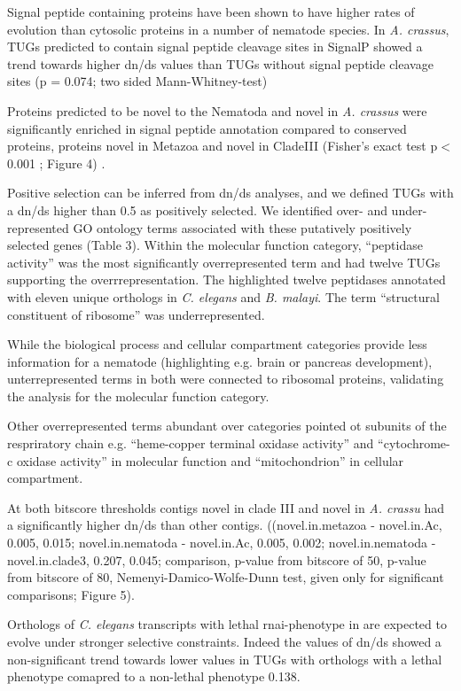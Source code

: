 \documentclass[10pt]{bmc_article}
\newenvironment{bmcformat}{\begin{raggedright}\baselineskip20pt\sloppy\setboolean{publ}{false}}{\end{raggedright}\baselineskip20pt\sloppy}
\begin{document}
\begin{bmcformat}
Signal peptide containing proteins have been shown to have higher
rates of evolution than cytosolic proteins in a number of nematode
species. In \textit{A. crassus}, TUGs predicted to contain signal
peptide cleavage sites in SignalP showed a trend towards higher dn/ds
values than TUGs without signal peptide cleavage sites (p =
0.074; two sided
Mann-Whitney-test) %

Proteins predicted to be novel to the Nematoda and novel in
\textit{A. crassus} were significantly enriched in signal peptide
annotation compared to conserved proteins, proteins novel in Metazoa
and novel in CladeIII (Fisher's exact test p$<$0.001 ; Figure 4) .

Positive selection can be inferred from dn/ds analyses, and we defined
TUGs with a dn/ds higher than 0.5 as positively selected. We
identified over- and under-represented GO ontology terms associated
with these putatively positively selected genes (Table 3). Within the
molecular function category, ``peptidase activity'' was the most
significantly overrepresented term and had twelve TUGs supporting the
overrrepresentation. The highlighted twelve peptidases annotated with
eleven unique orthologs in \textit{C. elegans} and \textit{B. malayi}.
The term ``structural constituent of ribosome'' was underrepresented.

While the biological process and cellular compartment categories
provide less information for a nematode (highlighting e.g. brain or
pancreas development), unterrepresented terms in both were connected
to ribosomal proteins, validating the analysis for the molecular
function category.

Other overrepresented terms abundant over categories pointed ot
subunits of the respriratory chain e.g. ``heme-copper terminal oxidase
activity'' and ``cytochrome-c oxidase activity'' in molecular function
and ``mitochondrion'' in cellular compartment.

At both bitscore thresholds contigs novel in clade III and novel in
\textit{A. crassu} had a significantly higher dn/ds than other contigs.
((novel.in.metazoa - novel.in.Ac, 0.005, 0.015; novel.in.nematoda -
novel.in.Ac, 0.005, 0.002; novel.in.nematoda - novel.in.clade3, 0.207,
0.045; comparison, p-value from bitscore of 50, p-value from bitscore
of 80, Nemenyi-Damico-Wolfe-Dunn test, given only for significant
comparisons; Figure 5).

Orthologs of \textit{C. elegans} transcripts with lethal
rnai-phenotype in are expected to evolve under stronger selective
constraints. Indeed the values of dn/ds showed a non-significant trend
towards lower values in TUGs with orthologs with a lethal phenotype
comapred to a non-lethal phenotype 0.138.


\end{bmcformat}
\end{document}
